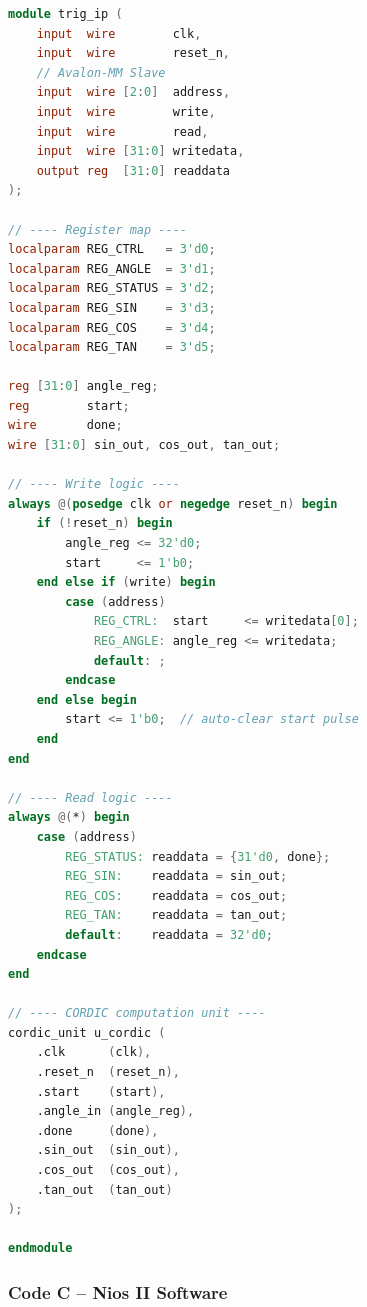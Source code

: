 \begin{lstlisting}[language=Verilog, caption={Verilog Source Code -- CORDIC IP Core (trig\_ip.v)}]
module trig_ip (
    input  wire        clk,
    input  wire        reset_n,
    // Avalon-MM Slave
    input  wire [2:0]  address,
    input  wire        write,
    input  wire        read,
    input  wire [31:0] writedata,
    output reg  [31:0] readdata
);

// ---- Register map ----
localparam REG_CTRL   = 3'd0;
localparam REG_ANGLE  = 3'd1;
localparam REG_STATUS = 3'd2;
localparam REG_SIN    = 3'd3;
localparam REG_COS    = 3'd4;
localparam REG_TAN    = 3'd5;

reg [31:0] angle_reg;
reg        start;
wire       done;
wire [31:0] sin_out, cos_out, tan_out;

// ---- Write logic ----
always @(posedge clk or negedge reset_n) begin
    if (!reset_n) begin
        angle_reg <= 32'd0;
        start     <= 1'b0;
    end else if (write) begin
        case (address)
            REG_CTRL:  start     <= writedata[0];
            REG_ANGLE: angle_reg <= writedata;
            default: ;
        endcase
    end else begin
        start <= 1'b0;  // auto-clear start pulse
    end
end

// ---- Read logic ----
always @(*) begin
    case (address)
        REG_STATUS: readdata = {31'd0, done};
        REG_SIN:    readdata = sin_out;
        REG_COS:    readdata = cos_out;
        REG_TAN:    readdata = tan_out;
        default:    readdata = 32'd0;
    endcase
end

// ---- CORDIC computation unit ----
cordic_unit u_cordic (
    .clk      (clk),
    .reset_n  (reset_n),
    .start    (start),
    .angle_in (angle_reg),
    .done     (done),
    .sin_out  (sin_out),
    .cos_out  (cos_out),
    .tan_out  (tan_out)
);

endmodule
\end{lstlisting}

\subsubsection{Code C -- Nios II Software}

